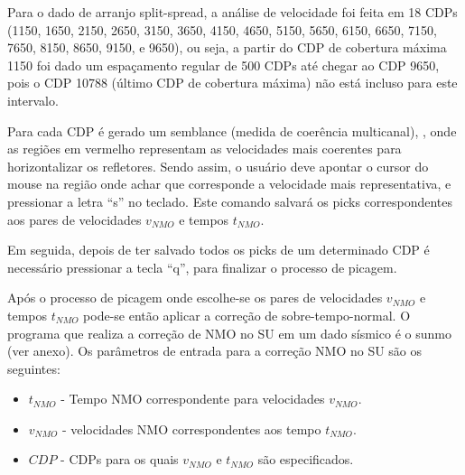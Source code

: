 Para o dado de arranjo split-spread, a análise de velocidade foi feita em 18 CDPs (1150, 1650, 2150, 2650, 3150, 3650, 4150, 4650, 5150, 5650, 6150, 6650, 7150, 7650, 8150, 8650, 9150, e 9650), ou seja, a partir do CDP de cobertura máxima 1150 foi dado um espaçamento regular de 500 CDPs até chegar ao CDP 9650, pois o CDP 10788 (último CDP de cobertura máxima) não está incluso para este intervalo.

Para cada CDP é gerado um semblance (medida de coerência multicanal), \citep{Sheriff(1995)}, onde as regiões em vermelho representam as velocidades mais coerentes para horizontalizar os refletores. Sendo assim, o usuário deve apontar o cursor do mouse na região onde achar que corresponde a velocidade mais representativa, e pressionar a letra ``s'' no teclado. Este comando salvará os picks correspondentes aos pares de velocidades $v_{NMO}$ e tempos $t_{NMO}$.

Em seguida, depois de ter salvado todos os picks de um determinado CDP é necessário pressionar a tecla ``q'', para finalizar o processo de picagem.

Após o processo de picagem onde escolhe-se os pares de velocidades $v_{NMO}$ e tempos $t_{NMO}$ pode-se então aplicar a correção de sobre-tempo-normal. O programa que realiza a correção de NMO no SU em um dado sísmico é o sunmo (ver anexo). Os parâmetros de entrada para a correção NMO no SU são os seguintes:

\begin{itemize}
 \item $t_{NMO}$ - Tempo NMO correspondente para velocidades $v_{NMO}$.
 \item $v_{NMO}$ - velocidades NMO correspondentes aos tempo $t_{NMO}$.
 \item $CDP$ - CDPs para os quais $v_{NMO}$ e $t_{NMO}$ são especificados.
\end{itemize}


